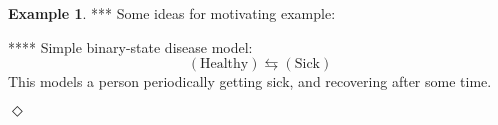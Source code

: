 \documentclass[10pt]{paper}
\theoremstyle{definition}
\newtheorem{exmp}{Example}%
\newcommand{\exampleend}{\hfill$\Diamond$}
\begin{document}
\begin{exmp}
*** Some ideas for motivating example:

**** Simple binary-state disease model:
\begin{equation*}
(\text{Healthy}) \leftrightarrows (\text{Sick})
\end{equation*}
This models a person periodically getting sick, and recovering after some time.

%
%

\exampleend
\end{exmp}
\end{document}
